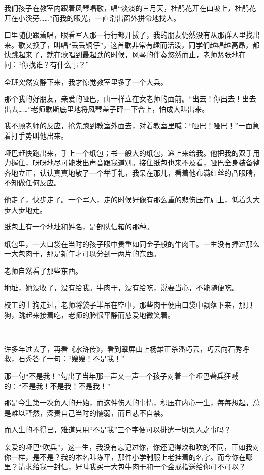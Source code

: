 \par 我们孩子在教室内跟着风琴唱歌，唱“淡淡的三月天，杜鹃花开在山坡上，杜鹃花开在小溪旁……”而我的眼光，一直滑出窗外拼命地找人。
\par 口里随便跟着唱，眼看军人那一行行都开拔了，我的朋友仍然没有从那群人里找出来。歌又换了，叫唱“丢丢铜仔”，这首歌非常有趣而活泼，同学们越唱越高昂，都快跳起来了，就在歌唱到最起劲的时候，风琴的伴奏悠然而止，老师紧张地在问：“你找谁？有什么事？”
\par 全班突然安静下来，我才惊觉教室里多了一个大兵。
\par 那个我的好朋友，亲爱的哑巴，山一样立在女老师的面前。“出去！你出去！出去出去……”老师歇斯底里地将风琴盖子砰一下合上，怕成大叫出来。
\par 我不顾老师的反应，抢先跑到教室外面去，对着教室里喊：“哑巴！哑巴！”一面急着打手势叫他出来。
\par 哑巴赶快跑出来，手上一个纸包；书一般大的纸包，递上来给我。他把我的双手用力握住，呀呀地尽可能发出声音跟我道别。接住纸包也来不及看，哑巴全身装备整齐地立正，认认真真地敬了一个举手礼，我呆在那儿，看着他布满红丝的凸眼睛，不知做任何反应。
\par 他走了，快步走了。一个军人，走的时候好像有那么重的悲伤压在肩上，低着头大步大步地走。
\par 纸包上有一个地址和姓名，是部队信箱的那种。
\par 纸包里，一大口袋在当时的孩子眼中贵重如同金子般的牛肉干。一生没有捧过那么一大包肉干，那是新年才可以分到一两片的东西。
\par 老师自然看了那些东西。
\par 地址，她没收了，没有给我。牛肉干，没有给吃，说要当心，不能随便吃。
\par 校工的土狗走过，老师将袋子半吊在空中，那些肉干便由口袋中飘落下来，那只狗，跳起来接着吃，老师的脸很平静而慈爱地微笑着。
\par  
\par 许多年过去了，再看《水浒传》，看到翠屏山上杨雄正杀潘巧云，巧云向石秀呼救，石秀答了一句：“嫂嫂！不是我！”
\par 那一句“不是我！”勾出了当年那一声又一声一个孩子对着一个哑巴聋兵狂喊的：“不是我！不是我！不是我！”
\par 那是今生第一次负人的开始，而这件伤人的事情，积压在内心一生，每每想起，总是难以释然，深责自己当时的懦弱，而且悲不自禁。
\par 而人生的不得已，难道只用“不是我”三个字便可以排遣一切负人之事吗？
\par 亲爱的哑巴“吹兵”，这一生，我没有忘记过你，你还记得炊和吹的不同，正如我对你一样，是不是？我的本名叫陈平，那件小学制服上老挂着的名字。而今你在哪里？请求给我一封信，好叫我买一大包牛肉干和一个金戒指送给你可不可以？




